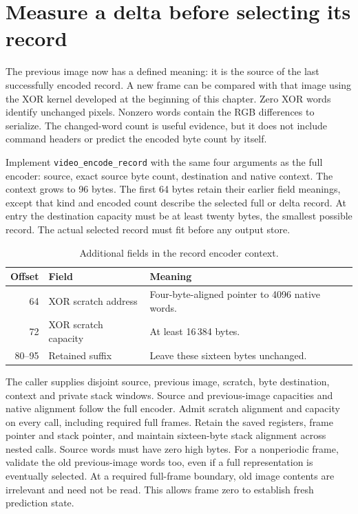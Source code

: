 \section{Measure a delta before selecting its record}
The previous image now has a defined meaning: it is the source of the last
successfully encoded record. A new frame can be compared with that image using
the XOR kernel developed at the beginning of this chapter. Zero XOR words identify
unchanged pixels. Nonzero words contain the RGB differences to serialize. The
changed-word count is useful evidence, but it does not include command headers or
predict the encoded byte count by itself.

Implement \texttt{video\_encode\_record} with the same four arguments as the full
encoder: source, exact source byte count, destination and native context. The
context grows to 96 bytes. The first 64 bytes retain their earlier field meanings,
except that kind and encoded count describe the selected full or delta record.
At entry the destination capacity must be at least twenty bytes, the smallest
possible record. The actual selected record must fit before any output store.

\begin{table}[htbp]
  \centering
  \caption{Additional fields in the record encoder context.}
  \label{tab:video-delta-encode-context}
  \begin{tabular}{r p{1.5in} p{2.8in}}
    \toprule
    Offset & Field                & Meaning                                         \\
    \midrule
    64     & XOR scratch address  & Four-byte-aligned pointer to 4096 native words. \\
    72     & XOR scratch capacity & At least 16\,384 bytes.                         \\
    80--95 & Retained suffix      & Leave these sixteen bytes unchanged.            \\
    \bottomrule
  \end{tabular}
\end{table}

The caller supplies disjoint source, previous image, scratch, byte destination,
context and private stack windows. Source and previous-image capacities and native
alignment follow the full encoder. Admit scratch alignment and capacity on every
call, including required full frames. Retain the saved registers, frame pointer and
stack pointer, and maintain sixteen-byte stack alignment across nested calls.
Source words must have zero high bytes. For a nonperiodic frame, validate the old
previous-image words too, even if a full representation is eventually selected.
At a required full-frame boundary, old image contents are irrelevant and need not
be read. This allows frame zero to establish fresh prediction state.

